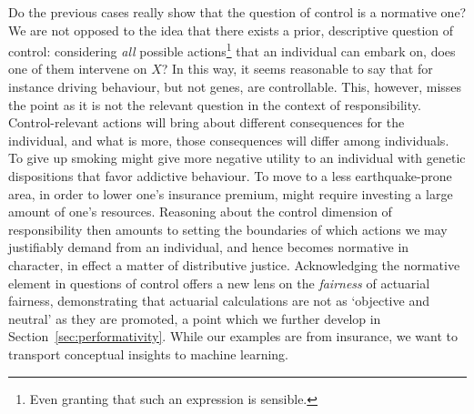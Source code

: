 \documentclass[11pt]{article} %
\begin{document}
Do the previous cases really show that the question of control is a normative one? We are not opposed to the idea that there exists a prior, descriptive question of control: considering \textit{all} possible actions\footnote{Even granting that such an expression is sensible.} that an individual can embark on, does one of them intervene on $X$? In this way, it seems reasonable to say that for instance driving behaviour, but not genes, are controllable. This, however, misses the point as it is not the relevant question in the context of responsibility. Control-relevant actions will bring about different consequences for the individual, and what is more, those consequences will differ among individuals. To give up smoking might give more negative utility to an individual with genetic dispositions that favor addictive behaviour. To move to a less earthquake-prone area, in order to lower one's insurance premium, might require investing a large amount of one's resources. Reasoning about the control dimension of responsibility then amounts to setting the boundaries of which actions we may justifiably demand from an individual, and hence becomes normative in character, in effect a matter of distributive justice.
Acknowledging the normative element in questions of control offers a new lens on the \textit{fairness} of actuarial fairness, demonstrating that actuarial calculations are not as `objective and neutral' as they are promoted, a point which we further develop in Section~\ref{sec:performativity}.
While our examples are from insurance, we want to transport conceptual insights to machine learning.
\end{document}
